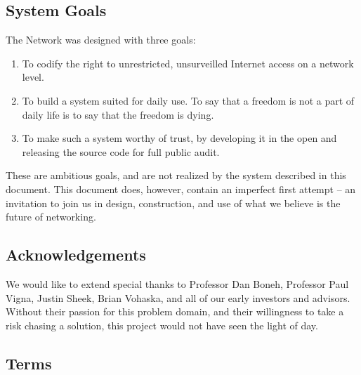 
\subsection{System Goals}

The \Orchid{} Network was designed with three goals:

\begin{enumerate}
\item To codify the right to unrestricted, unsurveilled Internet access on a network level.
\item To build a system suited for daily use. To say that a freedom is not a part of daily life is to say that the freedom is dying.
\item To make such a system worthy of trust, by developing it in the open and releasing the source code for full public audit.
\end{enumerate}

These are ambitious goals, and are not realized by the system described in this document. This document does, however, contain an imperfect first attempt – an invitation to join us in design, construction, and use of what we believe is the future of networking.

\subsection{Acknowledgements}

We would like to extend special thanks to Professor Dan Boneh, Professor Paul Vigna, Justin Sheek, Brian Vohaska, and all of our early investors and advisors. Without their passion for this problem domain, and their willingness to take a risk chasing a solution, this project would not have seen the light of day.

\subsection{Terms}

